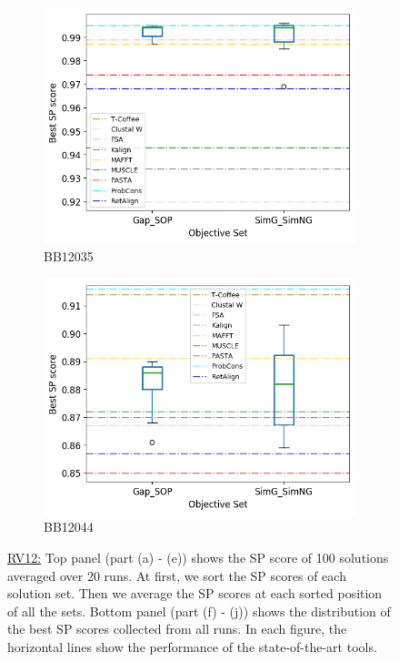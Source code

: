 \begin{figure}[!htbp]
\begin{adjustwidth}{-1cm}{-1cm}
\begin{subfigure}{0.22\textwidth}
			\includegraphics[width=\columnwidth]{Figure/summary/precomputedInit/Balibase/BB12035_objset_pairs_rank_2}
			\caption{BB12035}
		\end{subfigure}
		\begin{subfigure}{0.22\textwidth}
			\includegraphics[width=\columnwidth]{Figure/summary/precomputedInit/Balibase/BB12044_objset_pairs_rank_2}
			\caption{BB12044}
		\end{subfigure}
		\caption{\underline{RV12:} Top panel (part (a) - (e)) shows the SP score of 100 solutions averaged over 20 runs. At first, we sort the SP scores of each solution set. Then we average the SP scores at each sorted position of all the sets. Bottom panel (part (f) - (j)) shows the distribution of the best SP scores collected from all runs. In each figure, the horizontal lines show the performance of the state-of-the-art tools.}
		\label{fig:rv12_sp}
	\end{adjustwidth}
\end{figure}


